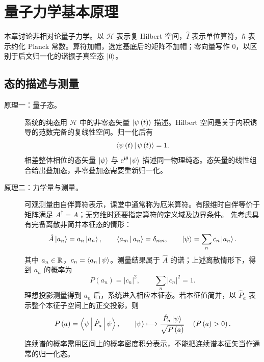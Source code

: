 \section{量子力学基本原理}
本章讨论非相对论量子力学。以 $\mathcal H$ 表示复 Hilbert 空间，$\hat I$ 表示单位算符，$\hbar$ 表示约化 Planck 常数。算符加帽，选定基底后的矩阵不加帽；零向量写作 $0$，以区别于后文归一化的谐振子真空态 $\Ket{0}$。

\subsection{态的描述与测量}
\begin{description}
\item[原理一：量子态。] 系统的纯态用 $\mathcal H$ 中的非零态矢量 $\Ket{\psi\left(t\right)}$ 描述。Hilbert 空间是关于内积诱导的范数完备的复线性空间。归一化后有
\begin{equation}
\Braket{\psi\left(t\right)|\psi\left(t\right)}=1.
\end{equation}
相差整体相位的态矢量 $\Ket{\psi}$ 与 $\mathrm{e}^{\mathrm{i}\theta}\Ket{\psi}$ 描述同一物理纯态。态矢量的线性组合给出叠加态，非零叠加态需要重新归一化。

\item[原理二：力学量与测量。] 可观测量由自伴算符表示，课堂中通常称为厄米算符。有限维时自伴等价于矩阵满足 $A^\dagger=A$；无穷维时还要指定算符的定义域及边界条件。
先考虑具有完备离散非简并本征态的情形：
\begin{equation}
\hat A\Ket{a_n}=a_n\Ket{a_n},\qquad
\Braket{a_m|a_n}=\delta_{mn},\qquad
\Ket{\psi}=\sum_n c_n\Ket{a_n}.
\end{equation}
其中 $a_n\in\mathbb{R}$，$c_n=\Braket{a_n|\psi}$。测量结果属于 $\hat A$ 的谱；上述离散情形下，得到 $a_n$ 的概率为
\begin{equation}
P\left(a_n\right)=\left|c_n\right|^2,\qquad \sum_n\left|c_n\right|^2=1.
\end{equation}
理想投影测量得到 $a_n$ 后，系统进入相应本征态。若本征值简并，以 $\hat P_a$ 表示整个本征子空间上的正交投影，则
\begin{equation}
P\left(a\right)=\Braket{\psi|\hat P_a|\psi},\qquad
\Ket{\psi}\longmapsto \frac{\hat P_a\Ket{\psi}}{\sqrt{P\left(a\right)}}\quad\left(P\left(a\right)>0\right).
\end{equation}
连续谱的概率需用区间上的概率密度积分表示，不能把连续谱本征矢当作通常的归一化态。
\end{description}

